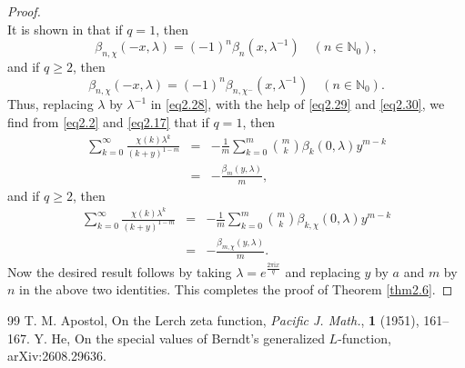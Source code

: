\documentclass[10pt,a4paper]{amsart}
\begin{document}
\begin{proof}
\begin{equation}
\end{equation}
It is shown in \cite[Proposition 2.3]{he} that if $q=1$, then
\begin{equation}\label{eq2.29}
\beta_{n,\chi}(-x,\lambda)=(-1)^{n}\beta_{n}(x,\lambda^{-1})\quad(n\in\mathbb{N}_{0}),
\end{equation}
and if $q\geqslant2$, then
\begin{equation}\label{eq2.30}
\beta_{n,\chi}(-x,\lambda)=(-1)^{n}\beta_{n,\chi^{-}}(x,\lambda^{-1})\quad(n\in\mathbb{N}_{0}).
\end{equation}
Thus, replacing $\lambda$ by $\lambda^{-1}$ in \eqref{eq2.28}, with the help of \eqref{eq2.29} and \eqref{eq2.30}, we find from \eqref{eq2.2} and \eqref{eq2.17} that if $q=1$, then
\begin{eqnarray*}
\sum_{k=0}^{\infty}\frac{\chi(k)\lambda^{k}}{(k+y)^{1-m}}&=&-\frac{1}{m}\sum_{k=0}^{m}\binom{m}{k}\beta_{k}(0,\lambda)y^{m-k}\nonumber\\
&=&-\frac{\beta_{m}(y,\lambda)}{m},
\end{eqnarray*}
and if $q\geqslant2$, then
\begin{eqnarray*}
\sum_{k=0}^{\infty}\frac{\chi(k)\lambda^{k}}{(k+y)^{1-m}}&=&-\frac{1}{m}\sum_{k=0}^{m}\binom{m}{k}\beta_{k,\chi}(0,\lambda)y^{m-k}\nonumber\\
&=&-\frac{\beta_{m,\chi}(y,\lambda)}{m}.
\end{eqnarray*}
Now the desired result follows by taking $\lambda=e^{\frac{2\pi \mathrm{i}x}{q}}$ and replacing $y$ by $a$ and $m$ by $n$ in the above two identities. This completes the proof of Theorem \ref{thm2.6}.
\end{proof}

\begin{thebibliography}{99}
 T. M. Apostol, On the Lerch zeta function, \emph{Pacific J. Math.}, \textbf{1} (1951), 161--167.
 Y. He, On the special values of Berndt's generalized $L$-function, arXiv:2608.29636.
\end{thebibliography}
\end{document}
